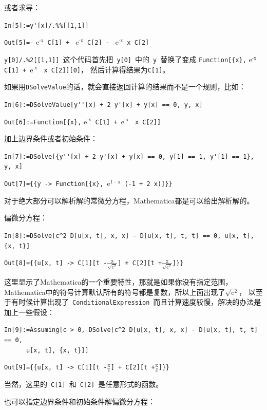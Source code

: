 \documentclass[UTF8,a4paper,10pt]{ctexart}
\begin{document}
或者求导：

\verb|In[5]:=y'[x]/.%%[[1,1]]|

\verb|Out[5]=-| $ \text{e}^\text{-x}$\verb| C[1] + | $ \text{e}^\text{-x}$\verb| C[2] - | $ \text{e}^\text{-x}$\verb| x C[2]|

\verb|y[0]/.%2[[1,1]]|~这个代码首先把~\verb|y[0]|~中的~\verb|y|~替换了变成
\verb|Function[{x},| $ \text{e}^\text{-x}$\verb| C[1] + |$\text{e}^\text{-x}$ \verb| x C[2]][0]|，
然后计算得结果为\verb|C[1]|。

如果用\verb|DSolveValue|的话，就会直接返回计算的结果而不是一个规则，比如：

\verb|In[6]:=DSolveValue[y''[x] + 2 y'[x] + y[x] == 0, y, x]|

\verb|Out[6]:=Function[{x},| $ \text{e}^\text{-x}$\verb| C[1] + |$\text{e}^\text{-x}$ \verb| x C[2]]|

加上边界条件或者初始条件：

\verb|In[7]:=DSolve[{y''[x] + 2 y'[x] + y[x] == 0, y[1] == 1, y'[1] == 1}, y, x]|

\verb|Out[7]={{y -> Function[{x}, |$\text{e}^\text{1 - x}$\verb| (-1 + 2 x)]}}|

对于绝大部分可以解析解的常微分方程，Mathematica都是可以给出解析解的。

偏微分方程：

\verb|In[8]:=DSolve[c^2 D[u[x, t], x, x] - D[u[x, t], t, t] == 0, u[x, t], {x, t}]|

\verb|Out[8]={{u[x, t] -> C[1][t -|$\frac{\text{x}}{\sqrt{\text{c}^2}}$\verb|] + C[2][t +|$\frac{\text{x}}{\sqrt{\text{c}^2}}$\verb|]}}|

这里显示了Mathematica的一个重要特性，那就是如果你没有指定范围，Mathematica中的符号计算默认所有的符号都是复数，所以上面出现了$\sqrt{\text{c}^2}$，
以至于有时候计算出现了~\verb|ConditionalExpression|~而且计算速度较慢，解决的办法是加上一些假设：

\verb|In[9]:=Assuming[c > 0, DSolve[c^2 D[u[x, t], x, x] - D[u[x, t], t, t] == 0, |\\
\verb|      u[x, t], {x, t}]]|

\verb|Out[9]={{u[x, t] -> C[1][t -|$\frac{\text{x}}{\text{c}}$\verb|] + C[2][t +|$\frac{\text{x}}{\text{c}}$\verb|]}}|

当然，这里的~\verb|C[1]|~和~\verb|C[2]|~是任意形式的函数。

也可以指定边界条件和初始条件解偏微分方程：
\end{document}
